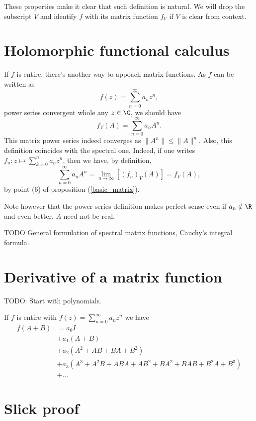 These properties make it clear that such definition is natural. We will drop the subscript $V$ and identify $f$ with its matrix function $f_{V}$ if $V$ is clear from context.

\section{Holomorphic functional calculus}

If $f$ is entire, there's another way to appoach matrix functions. As $f$ can be written as
\[
	f(z) = \sum_{n = 0}^{\infty} a_{n} z^{n},
\]
power series convergent whole any $z \in \C$, we should have
\[
	f_{V}(A) = \sum_{n = 0}^{\infty} a_{n} A^{n}.
\]
This matrix power series indeed converges as $\|A^{n}\| \leq \|A\|^{n}$. Also, this definition coincides with the spectral one. Indeed, if one writes $f_{n} : z \mapsto  \sum_{k = 0}^{n} a_{n} z^{n}$, then we have, by definition,
\[
	\sum_{n = 0}^{\infty}a_{n} A^{n} = \lim_{n \to \infty} \left[(f_{n})_{V}(A) \right] = f_{V}(A),
\]
by point (6) of proposition (\ref{basic_matrix}).

Note however that the power series definition makes perfect sense even if $a_{n} \notin \R$ and even better, $A$ need not be real.

TODO General formulation of spectral matrix functions, Cauchy's integral formula.

\section{Derivative of a matrix function}

TODO: Start with polynomials.

If $f$ is entire with $f(z) = \sum_{n = 0}^{\infty} a_{n} z^{n}$ we have
\begin{align*}
	f(A + B) &= a_{0} I \\
			&+ a_{1} (A + B) \\
			&+ a_{2} (A^2 + AB + BA + B^2) \\
			&+ a_{3} (A^3 + A^2 B + ABA + AB^2 + BA^2 + BAB + B^2A + B^3) \\
			&+ \ldots
\end{align*}


\section{Slick proof}

